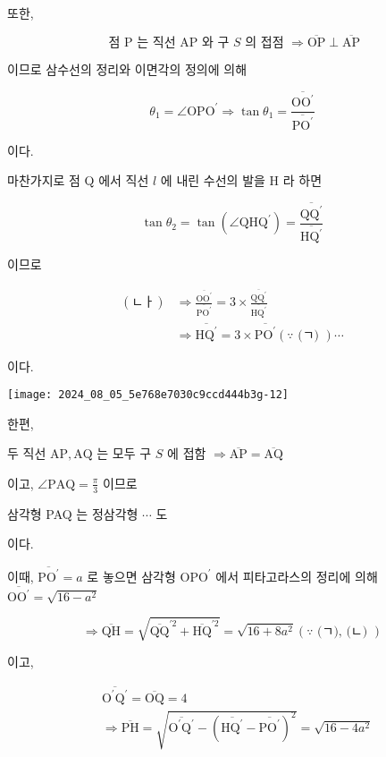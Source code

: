 \documentclass[10pt]{article}
\begin{document}
또한,

\[
\text { 점 } \mathrm{P} \text { 는 직선 } \mathrm{AP} \text { 와 구 } S \text { 의 접점 } \Rightarrow \overline{\mathrm{OP}} \perp \overline{\mathrm{AP}}
\]

이므로 삼수선의 정리와 이면각의 정의에 의해

\[
\theta_{1}=\angle \mathrm{OPO}^{\prime} \Rightarrow \tan \theta_{1}=\frac{\overline{\mathrm{OO}^{\prime}}}{\overline{\mathrm{PO}^{\prime}}}
\]

이다.

마찬가지로 점 Q 에서 직선 \(l\) 에 내린 수선의 발을 H 라 하면

\[
\tan \theta_{2}=\tan \left(\angle \mathrm{QHQ}^{\prime}\right)=\frac{\overline{\mathrm{QQ}^{\prime}}}{\overline{\mathrm{HQ}^{\prime}}}
\]

이므로

\[
\begin{aligned}
(ㄴ ㅏ) & \Rightarrow \frac{\overline{\mathrm{OO}^{\prime}}}{\overline{\mathrm{PO}^{\prime}}}=3 \times \frac{\overline{\mathrm{QQ}^{\prime}}}{\overline{\mathrm{HQ}^{\prime}}} \\
& \Rightarrow \overline{\mathrm{HQ}^{\prime}}=3 \times \overline{\mathrm{PO}^{\prime}}(\because \text { (ㄱ) }) \cdots
\end{aligned}
\]

이다.

\begin{center}
\texttt{[image: 2024\_08\_05\_5e768e7030c9ccd444b3g-12]}
\end{center}

한편,

두 직선 \(\mathrm{AP}, \mathrm{AQ}\) 는 모두 구 \(S\) 에 접함 \(\Rightarrow \overline{\mathrm{AP}}=\overline{\mathrm{AQ}}\)

이고, \(\angle \mathrm{PAQ}=\frac{\pi}{3}\) 이므로

삼각형 PAQ 는 정삼각형 \(\cdots\) 도

이다.

이때, \(\overline{\mathrm{PO}^{\prime}}=a\) 로 놓으면 삼각형 \(\mathrm{OPO}^{\prime}\) 에서 피타고라스의 정리에 의해 \(\overline{\mathrm{OO}^{\prime}}=\sqrt{16-a^{2}}\)

\[
\Rightarrow \overline{\mathrm{QH}}=\sqrt{\overline{\mathrm{QQ}}^{\prime 2}+\overline{\mathrm{HQ}}^{\prime 2}}=\sqrt{16+8 a^{2}}(\because \text { (ㄱ), (ㄴ) })
\]

이고,

\[
\begin{aligned}
& \overline{\mathrm{O}^{\prime} \mathrm{Q}^{\prime}}=\overline{\mathrm{OQ}}=4 \\
& \Rightarrow \overline{\mathrm{PH}}=\sqrt{\overline{\mathrm{O}^{\prime} \mathrm{Q}^{\prime}}-\left(\overline{\mathrm{HQ}^{\prime}}-\overline{\mathrm{PO}^{\prime}}\right)^{2}}=\sqrt{16-4 a^{2}}
\end{aligned}
\]
\end{document}

